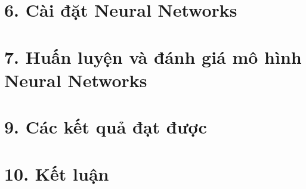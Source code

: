\documentclass{article}
\begin{document}
	\section{6. Cài đặt Neural Networks}
	
	\section{7. Huấn luyện và đánh giá mô hình Neural Networks}
	
	\section{9. Các kết quả đạt được}
	
	\section{10. Kết luận}
\end{document}
